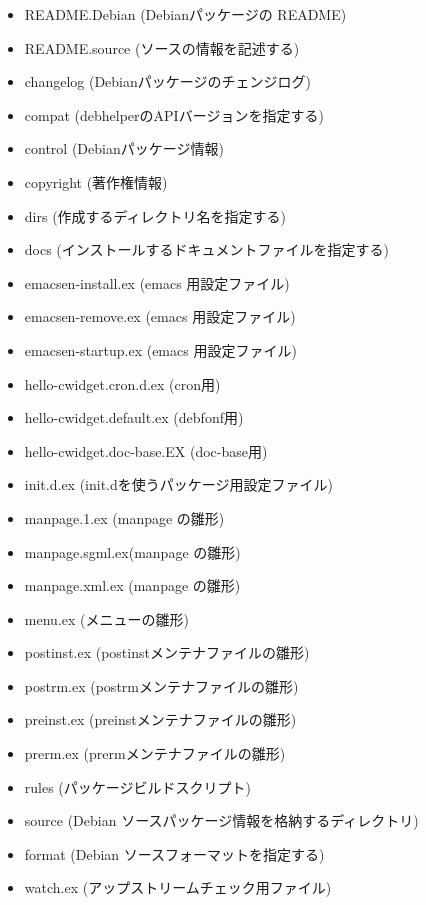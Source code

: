\documentclass[mingoth,a4paper]{jsarticle}
\begin{document}
\begin{itemize}
\item README.Debian  (Debianパッケージの README)
\item README.source  (ソースの情報を記述する)
\item changelog      (Debianパッケージのチェンジログ)
\item compat         (debhelperのAPIバージョンを指定する)
\item control        (Debianパッケージ情報)
\item copyright      (著作権情報)
\item dirs           (作成するディレクトリ名を指定する)
\item docs           (インストールするドキュメントファイルを指定する)
\item emacsen-install.ex (emacs 用設定ファイル)
\item emacsen-remove.ex  (emacs 用設定ファイル)
\item emacsen-startup.ex (emacs 用設定ファイル)
\item hello-cwidget.cron.d.ex (cron用)
\item hello-cwidget.default.ex (debfonf用)
\item hello-cwidget.doc-base.EX (doc-base用)
\item init.d.ex      (init.dを使うパッケージ用設定ファイル)
\item manpage.1.ex   (manpage の雛形)
\item manpage.sgml.ex(manpage の雛形)
\item manpage.xml.ex (manpage の雛形)
\item menu.ex        (メニューの雛形)
\item postinst.ex    (postinstメンテナファイルの雛形)
\item postrm.ex      (postrmメンテナファイルの雛形)
\item preinst.ex     (preinstメンテナファイルの雛形)
\item prerm.ex       (prermメンテナファイルの雛形)
\item rules          (パッケージビルドスクリプト)
\item source         (Debian ソースパッケージ情報を格納するディレクトリ)
\item format     (Debian ソースフォーマットを指定する)
\item watch.ex       (アップストリームチェック用ファイル)

\end{itemize}
\end{document}
